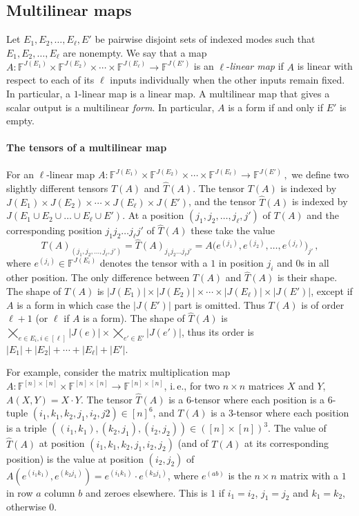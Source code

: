 \documentclass[11pt]{article}
\numberwithin{equation}{section}
\theoremstyle{definition}
\theoremstyle{plain}
\newcommand{\ie}{i.\,e.}
\newcommand{\F}{\ensuremath{\mathbb{F}}}
\begin{document}
\subsection{Multilinear maps}

Let $E_1,E_2,\ldots,E_\ell,E'$ be pairwise disjoint sets of indexed modes
such that $E_1,E_2,\ldots,E_\ell$ are nonempty. We say that a map
$
A:\F^{J(E_1)}\times\F^{J(E_2)}\times\cdots \times\F^{J(E_\ell)}
      \rightarrow \F^{J(E')}
$
is an $\ell$-\emph{linear map} if
$A$ is linear with respect to each of its $\ell$ inputs
individually when the other inputs remain fixed.
In particular, a $1$-linear map is a linear map.
A multilinear map that gives a scalar output is a multilinear \emph{form}.
In particular, $A$ is a form if and only if $E'$ is empty.

\paragraph*{The tensors of a multilinear map}

For an $\ell$-linear map
$
A:\F^{J(E_1)}\times\F^{J(E_2)}\times\cdots \times\F^{J(E_\ell)}\rightarrow \F^{J(E')}\,,
$
we define two slightly different tensors $T(A)$ and $\hat{T}(A)$. The tensor $T(A)$ is indexed by $J(E_1) \times J(E_2) \times \cdots \times J(E_\ell) \times J(E')$, and the tensor $\hat{T}(A)$ is indexed by $J(E_1 \cup E_2 \cup \ldots \cup E_\ell \cup E')$.  
At a position $(j_1, j_2, \ldots, j_\ell, j')$ of $T(A)$ and the corresponding position $j_1j_2\ldots j_\ell j'$ of $\hat{T}(A)$ these take the value
\[
T(A)_{(j_1, j_2, \ldots, j_\ell,j')} = \hat{T}(A)_{j_1j_2 \ldots j_\ell j'} =
A\bigl(e^{(j_1)},e^{(j_2)},\ldots,e^{(j_\ell)}\bigr)_{j'}\,,
\]
where $e^{(j_i)} \in \F^{J(E_i)}$ denotes the tensor with a $1$ in
position $j_i$ and $0$s in all other position.
The only difference between
$T(A)$ and $\hat{T}(A)$ is their shape.  The shape of $T(A)$ is
$|J(E_1)| \times |J(E_2)| \times \cdots \times |J(E_\ell)| \times
|J(E')|$,
except if $A$ is a form in which case the $|J(E')|$ part is omitted.
Thus $T(A)$ is of order $\ell+1$ (or $\ell$ if $A$ is a form).  The
shape of $\hat{T}(A)$ is $\bigtimes_{e \in E_i, i \in [\ell]} |J(e)| \times \bigtimes_{e' \in E'} |J(e')|$, thus
its order is $|E_1| + |E_2| + \cdots + |E_\ell| + |E'|$.

For example, consider the matrix multiplication map $A: \F^{[n] \times
  [n]} \times \F^{[n] \times[n]} \rightarrow \F^{[n] \times [n]}$,
\ie, for two $n\times n$ matrices $X$ and $Y$, $A(X, Y) = X \cdot Y$.
The tensor $\hat{T}(A)$ is a $6$-tensor where each position is a
$6$-tuple $(i_1, k_1, k_2, j_1, i_2, j2) \in [n]^6$, and $T(A)$ is a
$3$-tensor where each position is a triple $((i_1, k_1), (k_2, j_1),
(i_2, j_2)) \in ([n] \times [n])^3$.
The value of $\hat{T}(A)$ at position $(i_1, k_1, k_2, j_1, i_2,
j_2)$ (and of $T(A)$ at its corresponding position) is the value at position $(i_2,j_2)$ of
$A(e^{(i_1k_1)}, e^{(k_2j_1)}) = e^{(i_1k_1)}\cdot e^{(k_2j_1)}$, where $e^{(ab)}$ is the
$n\times n$ matrix with a $1$
in row $a$ column $b$ and zeroes elsewhere.  This is $1$ if $i_1 =
i_2$, $j_1=j_2$ and $k_1=k_2$, otherwise $0$.
\end{document}
